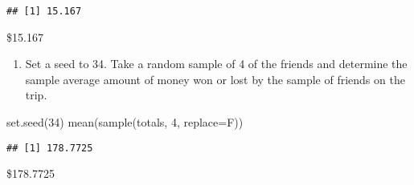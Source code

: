 \documentclass[]{article}
\newenvironment{Shaded}{\begin{snugshade}}{\end{snugshade}}
\newcommand{\AttributeTok}[1]{\textcolor[rgb]{0.77,0.63,0.00}{#1}}
\newcommand{\DecValTok}[1]{\textcolor[rgb]{0.00,0.00,0.81}{#1}}
\newcommand{\FunctionTok}[1]{\textcolor[rgb]{0.00,0.00,0.00}{#1}}
\newcommand{\NormalTok}[1]{#1}
\providecommand{\tightlist}{%
  \setlength{\itemsep}{0pt}\setlength{\parskip}{0pt}}
\begin{document}
\begin{verbatim}
## [1] 15.167
\end{verbatim}

\$15.167

\begin{enumerate}
\def\labelenumi{(\alph{enumi})}
\setcounter{enumi}{7}
\tightlist
\item
  Set a seed to 34. Take a random sample of 4 of the friends and
  determine the sample average amount of money won or lost by the sample
  of friends on the trip.
\end{enumerate}

\begin{Shaded}
\begin{Highlighting}[]
\FunctionTok{set.seed}\NormalTok{(}\DecValTok{34}\NormalTok{)}
\FunctionTok{mean}\NormalTok{(}\FunctionTok{sample}\NormalTok{(totals, }\DecValTok{4}\NormalTok{, }\AttributeTok{replace=}\NormalTok{F))}
\end{Highlighting}
\end{Shaded}

\begin{verbatim}
## [1] 178.7725
\end{verbatim}

\$178.7725
\end{document}
